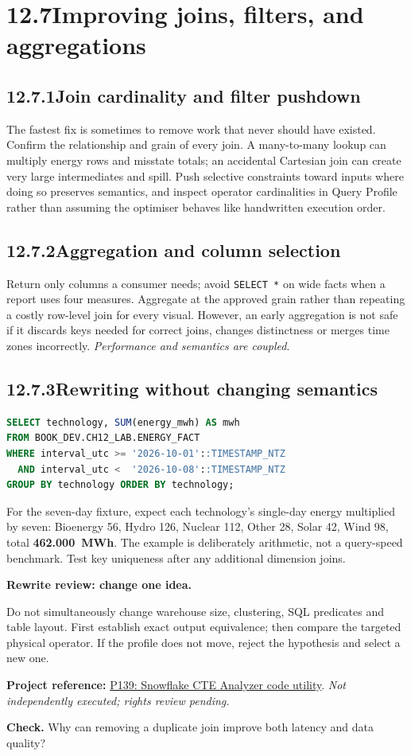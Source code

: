 \documentclass[11pt,twoside]{article}
\newcommand{\topic}[2]{\subsection*{#1\quad #2}}
\newcommand{\repo}[2]{\par\begingroup\fontsize{8.0}{9.6}\selectfont\sffamily\color{inkgray}\textbf{Project reference:} \href{#2}{#1}. \textit{Not independently executed; rights review pending.}\par\endgroup}
\begin{document}
\section*{12.7\quad Improving joins, filters, and aggregations}
\topic{12.7.1}{Join cardinality and filter pushdown}
The fastest fix is sometimes to remove work that never should have existed. Confirm the relationship and grain of every join. A many-to-many lookup can multiply energy rows and misstate totals; an accidental Cartesian join can create very large intermediates and spill. Push selective constraints toward inputs where doing so preserves semantics, and inspect operator cardinalities in Query Profile rather than assuming the optimiser behaves like handwritten execution order.
\topic{12.7.2}{Aggregation and column selection}
Return only columns a consumer needs; avoid \texttt{SELECT *} on wide facts when a report uses four measures. Aggregate at the approved grain rather than repeating a costly row-level join for every visual. However, an early aggregation is not safe if it discards keys needed for correct joins, changes distinctness or merges time zones incorrectly. \emph{Performance and semantics are coupled}. 
\topic{12.7.3}{Rewriting without changing semantics}
\begin{lstlisting}[language=SQL,caption={A safe baseline aggregation for the sample fixture.}]
SELECT technology, SUM(energy_mwh) AS mwh
FROM BOOK_DEV.CH12_LAB.ENERGY_FACT
WHERE interval_utc >= '2026-10-01'::TIMESTAMP_NTZ
  AND interval_utc <  '2026-10-08'::TIMESTAMP_NTZ
GROUP BY technology ORDER BY technology;
\end{lstlisting}
For the seven-day fixture, expect each technology's single-day energy multiplied by seven: Bioenergy 56, Hydro 126, Nuclear 112, Other 28, Solar 42, Wind 98, total \textbf{462.000~MWh}. The example is deliberately arithmetic, not a query-speed benchmark. Test key uniqueness after any additional dimension joins.
\begin{insight}\textbf{Rewrite review: change one idea.}\par
Do not simultaneously change warehouse size, clustering, SQL predicates and table layout. First establish exact output equivalence; then compare the targeted physical operator. If the profile does not move, reject the hypothesis and select a new one.\end{insight}
\repo{P139: Snowflake CTE Analyzer code utility}{https://github.com/dataengineerankur/SnowflakeCTEAnalyzer}
\textbf{Check.} Why can removing a duplicate join improve both latency and data quality?
\newpage
\end{document}
